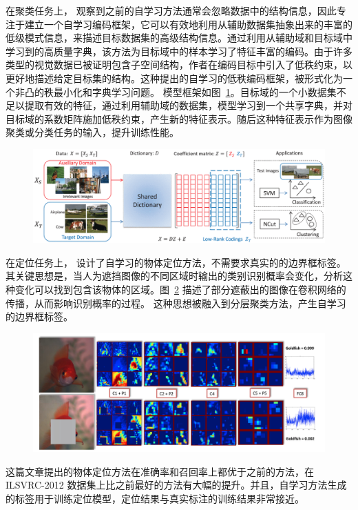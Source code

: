 在聚类任务上，\citet{li2017self} 观察到之前的自学习方法通常会忽略数据中的结构信息，因此专注于建立一个自学习编码框架，它可以有效地利用从辅助数据集抽象出来的丰富的低级模式信息，来描述目标数据集的高级结构信息。通过利用从辅助域和目标域中学习到的高质量字典，该方法为目标域中的样本学习了特征丰富的编码。由于许多类型的视觉数据已被证明包含子空间结构，作者在编码目标中引入了低秩约束，以更好地描述给定目标集的结构。这种提出的自学习的低秩编码框架，被形式化为一个非凸的秩最小化和字典学习问题。
模型框架如图~\ref{c2_fig8}。目标域的一个小数据集不足以提取有效的特征，通过利用辅助域的数据集，模型学习到一个共享字典，并对目标域的系数矩阵施加低秩约束，产生新的特征表示。随后这种特征表示作为图像聚类或分类任务的输入，提升训练性能。
    \begin{figure}[tbp]
        \centering 
        \includegraphics[width=1.0\textwidth]{img/c2/rel_b2.png}
        \label{c2_fig8}
    \end{figure}

在定位任务上，\citet{bazzani2016self} 设计了自学习的物体定位方法，不需要求真实的的边界框标签。其关键思想是，当人为遮挡图像的不同区域时输出的类别识别概率会变化，分析这种变化可以找到包含该物体的区域。图~\ref{c2_fig9} 描述了部分遮蔽出的图像在卷积网络的传播，从而影响识别概率的过程。
这种思想被融入到分层聚类方法，产生自学习的边界框标签。
    \begin{figure}[tbp]
        \centering 
        \includegraphics[width=1.0\textwidth]{img/c2/rel_b3.png}
        \label{c2_fig9}
    \end{figure}
这篇文章提出的物体定位方法在准确率和召回率上都优于之前的方法，在 ILSVRC-2012 数据集\citep{russakovsky2015imagenet}上比之前最好的方法有大幅的提升。并且，自学习方法生成的标签用于训练定位模型，定位结果与真实标注的训练结果非常接近。

